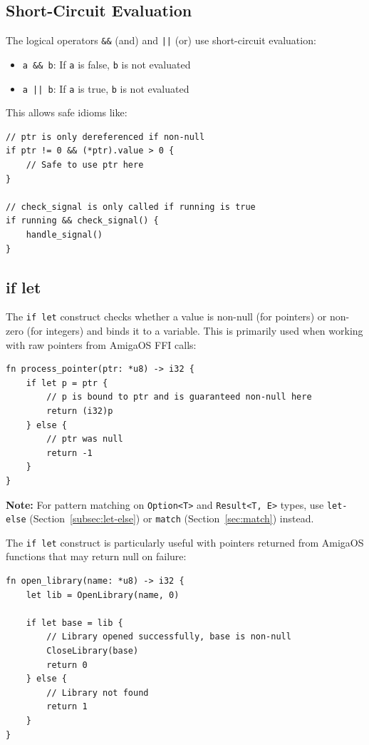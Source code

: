 \subsection{Short-Circuit Evaluation}
\label{subsec:short-circuit}

The logical operators \texttt{\&\&} (and) and \texttt{||} (or) use short-circuit evaluation:

\begin{itemize}
    \item \texttt{a \&\& b}: If \texttt{a} is false, \texttt{b} is not evaluated
    \item \texttt{a || b}: If \texttt{a} is true, \texttt{b} is not evaluated
\end{itemize}

This allows safe idioms like:

\begin{lstlisting}
// ptr is only dereferenced if non-null
if ptr != 0 && (*ptr).value > 0 {
    // Safe to use ptr here
}

// check_signal is only called if running is true
if running && check_signal() {
    handle_signal()
}
\end{lstlisting}

\subsection{if let}
\label{subsec:if-let}

The \texttt{if let} construct checks whether a value is non-null (for pointers) or non-zero (for integers) and binds it to a variable. This is primarily used when working with raw pointers from AmigaOS FFI calls:

\begin{lstlisting}
fn process_pointer(ptr: *u8) -> i32 {
    if let p = ptr {
        // p is bound to ptr and is guaranteed non-null here
        return (i32)p
    } else {
        // ptr was null
        return -1
    }
}
\end{lstlisting}

\textbf{Note:} For pattern matching on \texttt{Option<T>} and \texttt{Result<T, E>} types, use \texttt{let-else} (Section~\ref{subsec:let-else}) or \texttt{match} (Section~\ref{sec:match}) instead.

The \texttt{if let} construct is particularly useful with pointers returned from AmigaOS functions that may return null on failure:

\begin{lstlisting}
fn open_library(name: *u8) -> i32 {
    let lib = OpenLibrary(name, 0)

    if let base = lib {
        // Library opened successfully, base is non-null
        CloseLibrary(base)
        return 0
    } else {
        // Library not found
        return 1
    }
}
\end{lstlisting}

